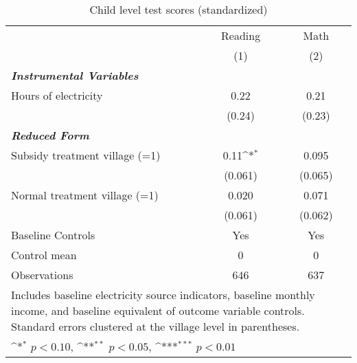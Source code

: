 \begin{table}[htbp]\centering
\def\sym#1{\ifmmode^{#1}\else\(^{#1}\)\fi}
\caption{Child level test scores (standardized)}
\begin{tabular}{l*{2}{c}}
\toprule
& Reading & Math \\
& (1) & (2) \\ \hline
\textbf{\emph{Instrumental Variables}}&                  &                  \\
Hours of electricity     &     0.22         &     0.21         \\
                &   (0.24)         &   (0.23)         \\


\textbf{\emph{Reduced Form}}&                  &                  \\
Subsidy treatment village (=1)   &     0.11\sym{*}  &    0.095         \\
                &  (0.061)         &  (0.065)         \\
Normal treatment village (=1)    &    0.020         &    0.071         \\
                &  (0.061)         &  (0.062)         \\
                \addlinespace
Baseline Controls &      Yes         &      Yes         \\

Control mean           &        0         &        0         \\
Observations    &      646         &      637         \\
\bottomrule
\multicolumn{3}{p{\textwidth}}{\footnotesize Includes baseline electricity source indicators, baseline monthly income, and baseline equivalent of outcome variable controls. Standard errors clustered at the village level in parentheses.}\\
\multicolumn{3}{p{\textwidth}}{\footnotesize \sym{*} \(p<0.10\), \sym{**} \(p<0.05\), \sym{***} \(p<0.01\)}\\
\end{tabular}\end{table}